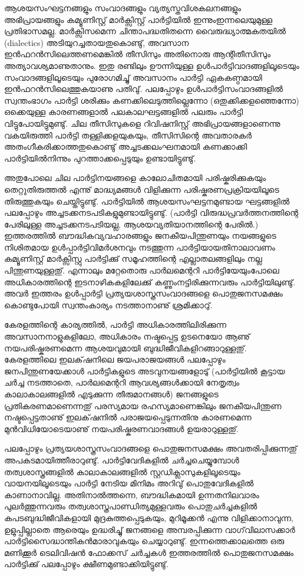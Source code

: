 ﻿
\vskip 2pt

ആശയസംഘട്ടനങ്ങളും സംവാദങ്ങളും വ്യത്യസ്തവിശകലനങ്ങളും അഭിപ്രായങ്ങളും കമ്യൂണിസ്റ്റ് മാര്‍ക്സിസ്റ്റ് പാര്‍ട്ടിയില്‍ 
ഇന്നുംഇന്നലെയുമുള്ള പ്രതിഭാസമല്ല. മാര്‍ക്സിസമെന്ന ചിന്താപദ്ധതിതന്നെ വൈരുദ്ധ്യാത്മകതയില്‍ (dialectics) 
അടിയുറച്ചതായതുകൊണ്ടു്, അവസാന ഇന്‍ഫറന്‍സിലെത്തണമെങ്കില്‍ തീസിസും അതിനൊരു ആന്റിതീസിസും 
അത്യാവശ്യമാണുതാനും. ഇതു രണ്ടിലും ഊന്നിയുള്ള ഉള്‍പാര്‍ട്ടിവാദങ്ങളിലൂടെയും സംവാദങ്ങളിലൂടെയും പുരോഗമിച്ചു് 
അവസാനം പാര്‍ട്ടി ഏകകണ്ഠമായി ഇന്‍ഫറന്‍സിലെത്തുകയാണു പതിവു്. പലപ്പോഴും ഉള്‍പാര്‍ട്ടിസംവാദങ്ങളില്‍ സ്വന്തംഭാഗം 
പാര്‍ട്ടി ശരിക്കും കണക്കിലെടുത്തില്ലെന്നോ (ഒതുക്കിക്കളഞ്ഞെന്നോ) ഒക്കെയുള്ള കാരണങ്ങളാല്‍ 
പലകാലഘട്ടങ്ങളില്‍ പലരും പാര്‍ട്ടി വിട്ടുപോയിട്ടുമുണ്ടു്. ചില തീസിസുകളെ റിവിഷനിസ്റ്റ് അഭിപ്രായങ്ങളാണെന്നു 
വകയിരുത്തി പാര്‍ട്ടി തള്ളിക്കളയുകയും, തീസിസിന്റെ അവതാരകര്‍ അതംഗീകരിക്കാത്തതുകൊണ്ടു് 
അച്ചടക്കലംഘനമായി കണക്കാക്കി പാര്‍ട്ടിയില്‍നിന്നും പുറത്താക്കപ്പെടുയും ഉണ്ടായിട്ടുണ്ടു്.

അതുപോലെ ചില പാര്‍ട്ടിനയങ്ങളെ കാലോചിതമായി പരിഷ്കരിക്കുകയും തെറ്റുതിരുത്തല്‍ എന്നു് മാദ്ധ്യമങ്ങള്‍ വിളിക്കുന്ന 
പരിഷ്കരണപ്രക്രിയയിലൂടെ തിരുത്തുകയും ചെയ്തിട്ടുണ്ടു്. പാര്‍ട്ടിയില്‍ ആശയസംഘട്ടനമുണ്ടായ ഘട്ടങ്ങളില്‍ പലപ്പോഴും 
അച്ചടക്കനടപടികളുമുണ്ടായിട്ടുണ്ടു്. (പാര്‍ട്ടി വിരുദ്ധപ്രവര്‍ത്തനത്തിന്റെ പേരിലുള്ള അച്ചടക്കനടപടിയല്ല, 
ആശയവ്യതിയാനത്തിന്റെ പേരില്‍.) ഇത്തരത്തില്‍ ബൗദ്ധികവ്യവഹാരങ്ങളും ജനകീയപിന്തുണയും നയങ്ങളുടെ 
നിശിതമായ ഉള്‍പ്പാര്‍ട്ടിവിമര്‍ശനവും നടത്തുന്ന പാര്‍ട്ടിയായതിനാലാവണം കമ്യൂണിസ്റ്റ് മാര്‍ക്സിസ്റ്റു പാര്‍ട്ടിക്കു് 
സമൂഹത്തിന്റെ എല്ലാതലങ്ങളിലും നല്ല പിന്തുണയുള്ളതു്. എന്നാലും മറ്റേതൊരു പാര്‍ലമെന്ററി പാര്‍ട്ടിയേയുംപോലെ 
അധികാരത്തിന്റെ ഇടനാഴികകളിലേക്കു് കണ്ണുംനട്ടിരിക്കുന്നവരും പാര്‍ട്ടിയിലുണ്ടു്. അവര്‍ ഇത്തരം ഉള്‍പ്പാര്‍ട്ടി 
പ്രത്യയശാസ്ത്രസംവാദങ്ങളെ പൊതുജനസമക്ഷം കൊണ്ടുപോയി സ്വന്തംകാര്യം നടത്താനാണു് ശ്രമിക്കാറു്.

കേരളത്തിന്റെ കാര്യത്തില്‍, പാര്‍ട്ടി അധികാരത്തിലിരിക്കുന്ന അവസാനനാളുകളിലോ, അധികാരം നഷ്ടപ്പെട്ട 
ഉടനെയോ ആണു് നയപരിഷ്കരണമെന്ന ആശയവുമായി ബുദ്ധിജീവികളിറങ്ങാറുള്ളതു്. കേരളത്തിലെ ഇലക്‌ഷനിലെ 
ജയപരാജയങ്ങള്‍ പലപ്പോഴും ജനപിന്തുണയേക്കാള്‍ പാര്‍ട്ടികളുടെ അടവുനയങ്ങളോടു് (പാര്‍ട്ടിയില്‍ കൂട്ടായ ചര്‍ച്ച 
നടത്താതെ, പാര്‍ലമെന്ററി ആവശ്യങ്ങള്‍ക്കായി നേതൃത്വം കാലാകാലങ്ങളില്‍ എടുക്കുന്ന തീരുമാനങ്ങള്‍) ജനങ്ങളുടെ 
പ്രതികരണമാണെന്നതു് പരസ്യമായ രഹസ്യമാണെങ്കിലും ജനകീയപിന്തുണ നഷ്ടപ്പെട്ടതാണു് ഇലക്‌ഷനില്‍ 
പരാജയപ്പെടുന്നതിനു കാരണമെന്ന മുന്‍വിധിയോടെയാണു് നയപരിഷ്കരണവാദങ്ങള്‍ ഉയരാറുള്ളതു്.

പലപ്പോഴും പ്രത്യയശാസ്ത്രസംവാദങ്ങളെ പൊതുജനസമക്ഷം അവതരിപ്പിക്കുന്നതു് അപകടമായിത്തീരാറുണ്ടു്. 
പാര്‍ട്ടിവേദികളില്‍ ചര്‍ച്ചചെയ്യുമ്പോള്‍ തത്വശാസ്ത്രങ്ങളില്‍ കാലാകാലങ്ങളില്‍ സ്റ്റഡിക്ലാസുകളിലൂടെയും 
വായനയിലൂടെയും പാര്‍ട്ടി നേടിയ മിനിമം അറിവു് പൊതുവേദികളില്‍ കാണാനാവില്ല. അതിനാല്‍ത്തന്നെ, ബൗദ്ധികമായി 
ഉന്നതനിലവാരം പുലര്‍ത്തുന്നവരും തത്വശാസ്ത്രപാണ്ഡിത്യമുള്ളവരും പൊതുചര്‍ച്ചകളില്‍ കപടബുദ്ധിജീവികളായി 
മുദ്രകുത്തപ്പെടുകയും, മുറിമൂക്കന്‍ എന്നു വിളിക്കാനാവുന്ന, ഉളുപ്പില്ലാതെ ആരെയും ഉദ്ധരിച്ചു് ജനങ്ങളെ അമ്പരപ്പിക്കുന്ന 
വാഗ്‌വിലാസക്കാര്‍ പാര്‍ട്ടിസൈദ്ധാന്തികന്‍മാരാവുകയും ചെയ്യാറുണ്ടു്. ഇന്നത്തെക്കാലത്തെ ഒരു മണിക്കൂര്‍ 
ടെലിവിഷന്‍ ഫോക്കസ് ചര്‍ച്ചകള്‍ ഇത്തരത്തില്‍ പൊതുജനസമക്ഷം പാര്‍ട്ടിക്കു് പലപ്പോഴും ക്ഷീണമുണ്ടാക്കിയിട്ടുണ്ടു്.

